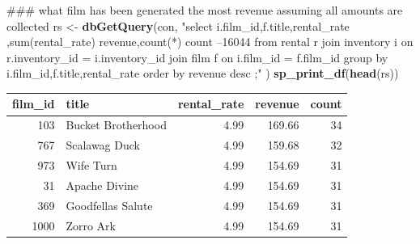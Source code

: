 \documentclass[]{book}
\newenvironment{Shaded}{\begin{snugshade}}{\end{snugshade}}
\newcommand{\KeywordTok}[1]{\textcolor[rgb]{0.13,0.29,0.53}{\textbf{#1}}}
\newcommand{\NormalTok}[1]{#1}
\newcommand{\StringTok}[1]{\textcolor[rgb]{0.31,0.60,0.02}{#1}}
\theoremstyle{definition}
\theoremstyle{definition}
\theoremstyle{definition}
\theoremstyle{remark}
\begin{document}
\begin{Shaded}
\begin{Highlighting}[]
\NormalTok{### what film has been generated the most revenue assuming all amounts are collected}
\NormalTok{rs <-}\StringTok{ }\KeywordTok{dbGetQuery}\NormalTok{(con,}
                \StringTok{"select i.film_id,f.title,rental_rate}
\StringTok{                       ,sum(rental_rate) revenue,count(*) count  --16044}
\StringTok{                   from rental r }
\StringTok{                        join inventory i}
\StringTok{                          on r.inventory_id = i.inventory_id}
\StringTok{                        join film f}
\StringTok{                          on i.film_id = f.film_id}
\StringTok{                 group by i.film_id,f.title,rental_rate}
\StringTok{                 order by revenue desc}
\StringTok{                 ;"}
\NormalTok{                )  }
\KeywordTok{sp_print_df}\NormalTok{(}\KeywordTok{head}\NormalTok{(rs))}
\end{Highlighting}
\end{Shaded}

\begin{tabular}{r|l|r|r|r}
\hline
film\_id & title & rental\_rate & revenue & count\\
\hline
103 & Bucket Brotherhood & 4.99 & 169.66 & 34\\
\hline
767 & Scalawag Duck & 4.99 & 159.68 & 32\\
\hline
973 & Wife Turn & 4.99 & 154.69 & 31\\
\hline
31 & Apache Divine & 4.99 & 154.69 & 31\\
\hline
369 & Goodfellas Salute & 4.99 & 154.69 & 31\\
\hline
1000 & Zorro Ark & 4.99 & 154.69 & 31\\
\hline
\end{tabular}
\end{document}
